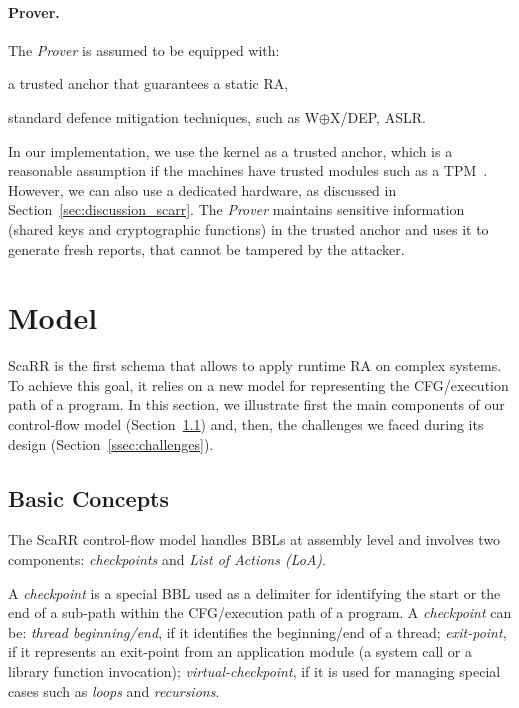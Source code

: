 \paragraph{Prover.}
The \emph{Prover} is assumed to be equipped with:
\begin{enumerate*}[label=(\roman*)]
	\item a trusted anchor that guarantees a static RA,
	\item standard defence mitigation techniques, such as W$\oplus$X/DEP, ASLR.
\end{enumerate*}
In our implementation, we use the kernel as a trusted anchor, which is a 
reasonable assumption if the machines have trusted modules such as a 
TPM~\citep{tomlinson2017introduction}. 
However, we can also use a dedicated hardware, as discussed in 
Section~\ref{sec:discussion_scarr}. The \emph{Prover} maintains sensitive 
information 
(\ie shared keys and cryptographic functions) in the trusted anchor and uses it 
to generate fresh reports, that cannot be tampered by the attacker. 

\section{Model}
\label{sec:model}

ScaRR is the first schema that allows to apply runtime RA on complex systems. 
To achieve this goal, it relies on a new model for representing the 
CFG/execution path of a program. In this section, we illustrate first the main 
components of our control-flow model (Section~\ref{ssec:basic_concepts}) and, 
then, the challenges we faced during its design (Section~\ref{ssec:challenges}).

\subsection{Basic Concepts}
\label{ssec:basic_concepts}

The ScaRR control-flow model handles BBLs at assembly level and involves two 
components: \emph{checkpoints} and \emph{List of Actions (LoA)}.


A \emph{checkpoint} is a special BBL used as a delimiter for identifying the 
start or the end of a sub-path within the CFG/execution path of a program. A 
\emph{checkpoint} can be: \emph{thread beginning/end}, if it identifies the 
beginning/end of a thread; \emph{exit-point}, if it represents an exit-point 
from an application module (\eg a system call or a library function 
invocation); \emph{virtual-checkpoint}, if it is used for managing special 
cases such as \emph{loops} and \emph{recursions}. 

